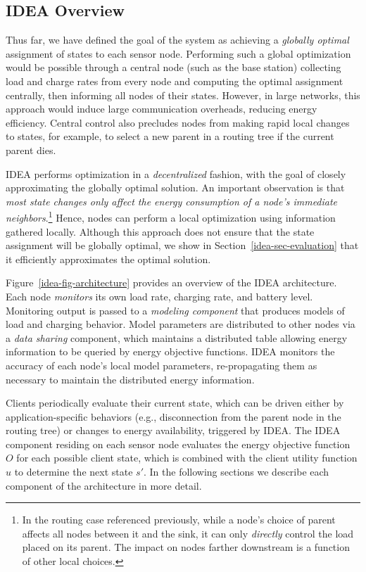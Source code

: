 \subsection{IDEA Overview}

Thus far, we have defined the goal of the system as achieving a
\textit{globally optimal} assignment of states to each sensor node.
Performing such a global optimization would be possible through a central
node (such as the base station) collecting load and charge rates from every
node and computing the optimal assignment centrally, then informing all nodes
of their states. However, in large networks, this approach would induce large
communication overheads, reducing energy efficiency. Central control also
precludes nodes from making rapid local changes to states, for example, to
select a new parent in a routing tree if the current parent dies.

IDEA performs optimization in a \textit{decentralized} fashion, with the goal
of closely approximating the globally optimal solution. An important
observation is that \textit{most state changes only affect the energy
consumption of a node's immediate neighbors}.\footnote{In the routing case
referenced previously, while a node's choice of parent affects all nodes
between it and the sink, it can only \textit{directly} control the load
placed on its parent. The impact on nodes farther downstream is a function of
other local choices.} Hence, nodes can perform a local optimization using
information gathered locally. Although this approach does not ensure that the
state assignment will be globally optimal, we show in
Section~\ref{idea-sec-evaluation} that it efficiently approximates the
optimal solution.

Figure~\ref{idea-fig-architecture} provides an overview of the IDEA
architecture. Each node \textit{monitors} its own load rate, charging rate,
and battery level.  Monitoring output is passed to a \textit{modeling
component} that produces models of load and charging behavior. Model
parameters are distributed to other nodes via a \textit{data sharing}
component, which maintains a distributed table allowing energy information to
be queried by energy objective functions. IDEA monitors the accuracy of each
node's local model parameters, re-propagating them as necessary to maintain
the distributed energy information.

Clients periodically evaluate their current state, which can be driven either
by application-specific behaviors (e.g., disconnection from the parent node
in the routing tree) or changes to energy availability, triggered by IDEA.
The IDEA component residing on each sensor node evaluates the energy
objective function $O$ for each possible client state, which is combined with
the client utility function $u$ to determine the next state $s'$. In the
following sections we describe each component of the architecture in more
detail.

